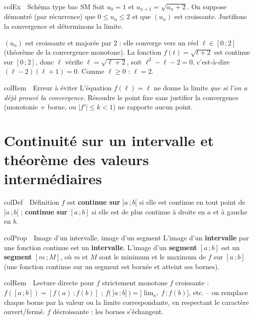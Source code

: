 \documentclass[11pt,a4paper]{article}
\newenvironment{definition}[1][Définition]
  {\begin{fiche}{colDef}{\ding{110}~~#1}}{\end{fiche}}
\newenvironment{propriete}[1][Propriété]
  {\begin{fiche}{colProp}{\ding{72}~~#1}}{\end{fiche}}
\newenvironment{exemple}[1][Exemple]
  {\begin{fiche}{colEx}{\ding{217}~~#1}}{\end{fiche}}
\newenvironment{remarque}[1][Remarque]
  {\begin{fiche}{colRem}{\ding{43}~~#1}}{\end{fiche}}
\begin{document}
\begin{exemple}[Schéma type bac SM]
Soit $u_0 = 1$ et $u_{n+1} = \sqrt{u_n + 2}$. On suppose démontré (par récurrence) que $0 \leq u_n \leq 2$ et que $(u_n)$ est croissante. Justifions la convergence et déterminons la limite.

\smallskip
$(u_n)$ est croissante et majorée par $2$ : elle converge vers un réel $\ell \in [0\,;2]$ (théorème de la convergence monotone). La fonction $f(t) = \sqrt{t + 2}$ est continue sur $[0\,;2]$, donc $\ell$ vérifie $\ell = \sqrt{\ell + 2}$, soit $\ell^2 - \ell - 2 = 0$, c'est-à-dire $(\ell - 2)(\ell + 1) = 0$. Comme $\ell \geq 0$ : $\boxed{\ell = 2}$.
\end{exemple}

\begin{remarque}[Erreur à éviter]
L'équation $f(\ell) = \ell$ ne donne la limite \emph{que si l'on a déjà prouvé la convergence}. Résoudre le point fixe sans justifier la convergence (monotonie + borne, ou $|f'| \leq k < 1$) ne rapporte aucun point.
\end{remarque}

\section{Continuité sur un intervalle et théorème des valeurs intermédiaires}

\begin{definition}
$f$ est \textbf{continue sur} $]a\,;b[$ si elle est continue en tout point de $]a\,;b[$ ; \textbf{continue sur} $[a\,;b]$ si elle est de plus continue à droite en $a$ et à gauche en $b$.
\end{definition}

\begin{propriete}[{Image d'un intervalle, image d'un segment}]
L'image d'un \textbf{intervalle} par une fonction continue est un \textbf{intervalle}. L'image d'un \textbf{segment} $[a\,;b]$ est un \textbf{segment} $[m\,;M]$, où $m$ et $M$ sont le minimum et le maximum de $f$ sur $[a\,;b]$ (une fonction continue sur un segment est bornée et atteint ses bornes).
\end{propriete}

\begin{remarque}[Lecture directe pour $f$ strictement monotone]
$f$ croissante : $f([a\,;b]) = [f(a)\,;f(b)]$ ; $f\bigl(\,]a\,;b]\,\bigr) = \bigl]\lim_{a^+} f\,;f(b)\bigr]$, etc. -- on remplace chaque borne par la valeur ou la limite correspondante, en respectant le caractère ouvert/fermé. $f$ décroissante : les bornes s'échangent.
\end{remarque}
\end{document}
